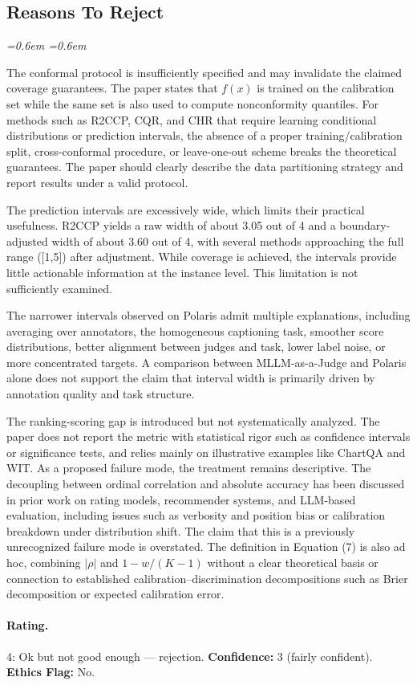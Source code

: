 \documentclass[10pt]{article}
\newenvironment{reviewerquote}{%
  \par\addvspace{0.25ex}\begingroup
  \footnotesize\itshape
  \leftskip=0.6em \rightskip=0.6em
  \color{black!78}
  \setlength{\parskip}{0.35ex plus 0.1ex}
}{%
  \endgroup\par\addvspace{0.25ex}
}
\begin{document}
\subsection*{Reasons To Reject}
\begin{reviewerquote}
The conformal protocol is insufficiently specified and may invalidate the claimed coverage guarantees. The paper states that $f(x)$ is trained on the calibration set while the same set is also used to compute nonconformity quantiles. For methods such as R2CCP, CQR, and CHR that require learning conditional distributions or prediction intervals, the absence of a proper training/calibration split, cross-conformal procedure, or leave-one-out scheme breaks the theoretical guarantees. The paper should clearly describe the data partitioning strategy and report results under a valid protocol.

The prediction intervals are excessively wide, which limits their practical usefulness. R2CCP yields a raw width of about 3.05 out of 4 and a boundary-adjusted width of about 3.60 out of 4, with several methods approaching the full range ([1,5]) after adjustment. While coverage is achieved, the intervals provide little actionable information at the instance level. This limitation is not sufficiently examined.

The narrower intervals observed on Polaris admit multiple explanations, including averaging over annotators, the homogeneous captioning task, smoother score distributions, better alignment between judges and task, lower label noise, or more concentrated targets. A comparison between MLLM-as-a-Judge and Polaris alone does not support the claim that interval width is primarily driven by annotation quality and task structure.

The ranking-scoring gap is introduced but not systematically analyzed. The paper does not report the metric with statistical rigor such as confidence intervals or significance tests, and relies mainly on illustrative examples like ChartQA and WIT. As a proposed failure mode, the treatment remains descriptive. The decoupling between ordinal correlation and absolute accuracy has been discussed in prior work on rating models, recommender systems, and LLM-based evaluation, including issues such as verbosity and position bias or calibration breakdown under distribution shift. The claim that this is a previously unrecognized failure mode is overstated. The definition in Equation (7) is also ad hoc, combining $|\rho|$ and $1 - w/(K-1)$ without a clear theoretical basis or connection to established calibration--discrimination decompositions such as Brier decomposition or expected calibration error.
\end{reviewerquote}

\paragraph{Rating.} 4: Ok but not good enough --- rejection. \quad \textbf{Confidence:} 3 (fairly confident). \quad \textbf{Ethics Flag:} No.
\end{document}
